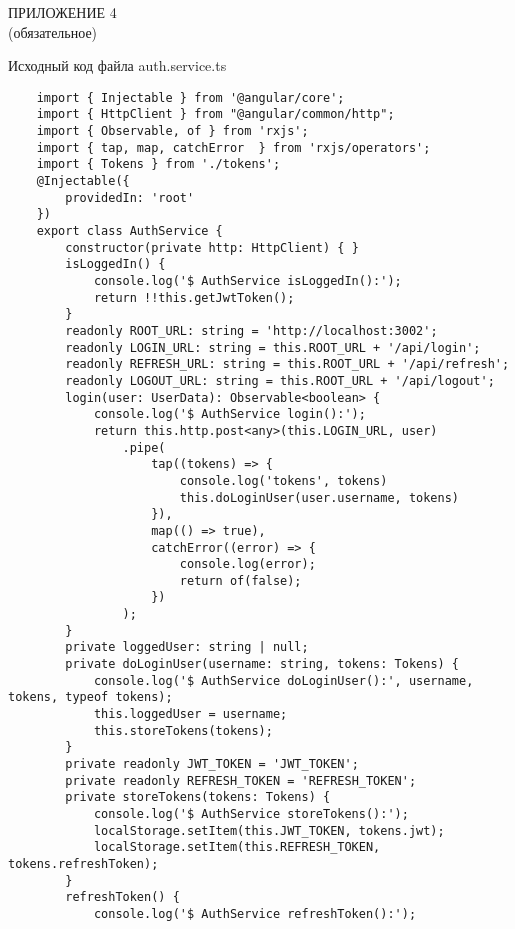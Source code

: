 {}
\begin{center}
    ПРИЛОЖЕНИЕ 4\\
    (обязательное)


    Исходный код файла auth.service.ts
\end{center}

\begin{lstlisting}
    import { Injectable } from '@angular/core';
    import { HttpClient } from "@angular/common/http";
    import { Observable, of } from 'rxjs';
    import { tap, map, catchError  } from 'rxjs/operators';
    import { Tokens } from './tokens';
    @Injectable({
        providedIn: 'root'
    })
    export class AuthService {
        constructor(private http: HttpClient) { }
        isLoggedIn() {
            console.log('$ AuthService isLoggedIn():');
            return !!this.getJwtToken();
        }
        readonly ROOT_URL: string = 'http://localhost:3002';
        readonly LOGIN_URL: string = this.ROOT_URL + '/api/login'; 
        readonly REFRESH_URL: string = this.ROOT_URL + '/api/refresh';
        readonly LOGOUT_URL: string = this.ROOT_URL + '/api/logout';
        login(user: UserData): Observable<boolean> {
            console.log('$ AuthService login():');
            return this.http.post<any>(this.LOGIN_URL, user)
                .pipe(
                    tap((tokens) => {
                        console.log('tokens', tokens)
                        this.doLoginUser(user.username, tokens)
                    }),
                    map(() => true),
                    catchError((error) => {
                        console.log(error);
                        return of(false);
                    })
                );
        }
        private loggedUser: string | null;
        private doLoginUser(username: string, tokens: Tokens) {
            console.log('$ AuthService doLoginUser():', username, tokens, typeof tokens);
            this.loggedUser = username;
            this.storeTokens(tokens);
        }
        private readonly JWT_TOKEN = 'JWT_TOKEN';
        private readonly REFRESH_TOKEN = 'REFRESH_TOKEN';
        private storeTokens(tokens: Tokens) {
            console.log('$ AuthService storeTokens():');
            localStorage.setItem(this.JWT_TOKEN, tokens.jwt);
            localStorage.setItem(this.REFRESH_TOKEN, tokens.refreshToken);
        }
        refreshToken() {
            console.log('$ AuthService refreshToken():');

\end{lstlisting}

